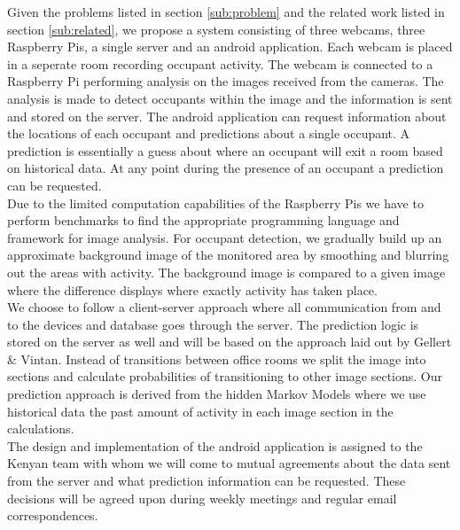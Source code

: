 Given the problems listed in section \ref{sub:problem} and the related work listed in section \ref{sub:related}, we propose a system consisting of three webcams, three Raspberry Pis, a single server and an android application. Each webcam is placed in a seperate room recording occupant activity. The webcam is connected to a Raspberry Pi performing analysis on the images received from the cameras. The analysis is made to detect occupants within the image and the information is sent and stored on the server. The android application can request information about the locations of each occupant and predictions about a single occupant. A prediction is essentially a guess about where an occupant will exit a room based on historical data. At any point during the presence of an occupant a prediction can be requested. \\
Due to the limited computation capabilities of the Raspberry Pis we have to perform benchmarks to find the appropriate programming language and framework for image analysis. For occupant detection, we gradually build up an approximate background image of the monitored area by smoothing and blurring out the areas with activity. The background image is compared to a given image where the difference displays where exactly activity has taken place. \\
We choose to follow a client-server approach where all communication from and to the devices and database goes through the server. The prediction logic is stored on the server as well and will be based on the approach laid out by Gellert \& Vintan\cite{gellert}. Instead of transitions between office rooms we split the image into sections and calculate probabilities of transitioning to other image sections. Our prediction approach is derived from the hidden Markov Models where we use historical data the past amount of activity in each image section in the calculations. \\
The design and implementation of the android application is assigned to the Kenyan team with whom we will come to mutual agreements about the data sent from the server and what prediction information can be requested. These decisions will be agreed upon during weekly meetings and regular email correspondences.

